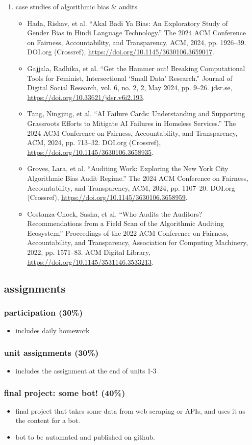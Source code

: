 \documentclass[11pt]{article}
\begin{document}
\begin{enumerate}
\item case studies of algorithmic bias \& audits
\label{sec:org11c2bb0}
\begin{itemize}
\item Hada, Rishav, et al. “Akal Badi Ya Bias: An Exploratory Study of
Gender Bias in Hindi Language Technology.” The 2024 ACM Conference
on Fairness, Accountability, and Transparency, ACM, 2024, pp.
1926–39. DOI.org (Crossref),
\url{https://doi.org/10.1145/3630106.3659017}.
\item Gajjala, Radhika, et al. “Get the Hammer out! Breaking Computational
Tools for Feminist, Intersectional ‘Small Data’ Research.” Journal
of Digital Social Research, vol. 6, no. 2, 2, May 2024, pp. 9–26.
jdsr.se, \url{https://doi.org/10.33621/jdsr.v6i2.193}.
\item Tang, Ningjing, et al. “AI Failure Cards: Understanding and
Supporting Grassroots Efforts to Mitigate AI Failures in Homeless
Services.” The 2024 ACM Conference on Fairness, Accountability, and
Transparency, ACM, 2024, pp. 713–32. DOI.org (Crossref),
\url{https://doi.org/10.1145/3630106.3658935}.
\item Groves, Lara, et al. “Auditing Work: Exploring the New York City
Algorithmic Bias Audit Regime.” The 2024 ACM Conference on Fairness,
Accountability, and Transparency, ACM, 2024, pp. 1107–20. DOI.org
(Crossref), \url{https://doi.org/10.1145/3630106.3658959}.
\item Costanza-Chock, Sasha, et al. “Who Audits the Auditors?
Recommendations from a Field Scan of the Algorithmic Auditing
Ecosystem.” Proceedings of the 2022 ACM Conference on Fairness,
Accountability, and Transparency, Association for Computing
Machinery, 2022, pp. 1571–83. ACM Digital Library,
\url{https://doi.org/10.1145/3531146.3533213}.
\end{itemize}
\end{enumerate}


\subsection{assignments}
\label{sec:orgafacd38}
\subsubsection{participation (30\%)}
\label{sec:org8a80c86}
\begin{itemize}
\item includes daily homework
\end{itemize}
\subsubsection{unit assignments (30\%)}
\label{sec:orgc35bf52}
\begin{itemize}
\item includes the assignment at the end of units 1-3
\end{itemize}
\subsubsection{final project: some bot! (40\%)}
\label{sec:org5428328}
\begin{itemize}
\item final project that takes some data from web scraping or APIs, and
uses it as the content for a bot.
\item bot to be automated and published on github.
\end{itemize}
\end{document}

